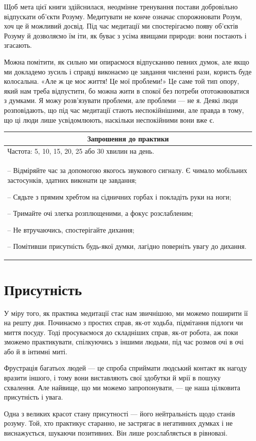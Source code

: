 \documentclass[oneside, 12pt]{book}
\newenvironment{prat}[1]
{\begin{center}
\begin{tabular}{p{0.9\textwidth}}
\hline\hline
\multicolumn{1}{c}{Запрошення до практики}\\
\hline
Частота: #1.\\
\hline
}{\\
\hline\hline
\end{tabular} 
\end{center}}
\begin{document}
Щоб мета цієї книги здійснилася, неодмінне тренування постави добровільно відпускати об'єкти Розуму. Медитувати не конче означає спорожнювати Розум, хоч це й можливий досвід. Під час медитації ми спостерігаємо появу об'єктів Розуму й дозволяємо їм іти, як буває з усіма явищами природи: вони постають і згасають.

Можна помітити, як сильно ми опираємося відпусканню певних думок, але якщо ми докладемо зусиль і справді виконаємо це завдання численні рази, користь буде колосальна. «Але ж це моє життя! Це мої проблеми!» Це саме той тип опору, який нам треба відпустити, бо можна жити в спокої без потреби ототожнюватися з думками. Я можу розв'язувати проблеми, але проблеми --- не я. Деякі люди розповідають, що під час медитації стають неспокійнішими, але правда в тому, що ці люди лише усвідомлюють, наскільки неспокійними вони вже є.

\begin{prat}{5, 10, 15, 20, 25 або 30 хвилин на день}
-- Відміряйте час за допомогою якогось звукового сигналу. Є чимало мобільних застосунків, здатних виконати це завдання;

-- Сядьте з прямим хребтом на сідничних горбах і покладіть руки на ноги;

-- Тримайте очі злегка розплющеними, а фокус розслабленим;

-- Не втручаючись, спостерігайте дихання;

-- Помітивши присутність будь-якої думки, лагідно поверніть увагу до дихання.
\end{prat}

\section*{Присутність}

У міру того, як практика медитації стає нам звичнішою, ми можемо поширити її на решту дня. Починаємо з простих справ, як-от ходьба, підмітання підлоги чи миття посуду. Тоді просуваємося до складніших справ, як-от робота, аж поки зможемо практикувати, спілкуючись з іншими людьми, під час розмов очі в очі або й в інтимні миті.

Фрустрація багатьох людей --- це спроба сприймати людський контакт як нагоду вразити іншого, і тому вони виставляють свої здобутки й мрії в пошуку схвалення. Але найвище, що ми можемо запропонувати, --- це наша цілковита присутність і увага.

Одна з великих красот стану присутності --- його нейтральність щодо станів розуму. Той, хто практикує старанно, не застрягає в негативних думках і не виснажується, шукаючи позитивних. Він лише розслабляється в рівновазі.
\end{document}
